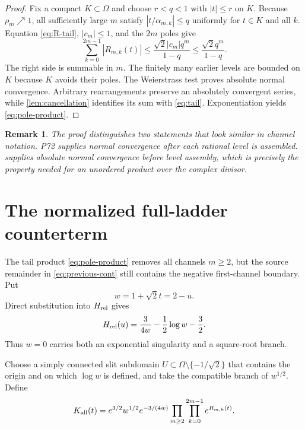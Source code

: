 \documentclass[11pt]{article}
\newtheorem{remark}[theorem]{Remark}
\newcommand{\Kall}{K_{\rm all}}
\begin{document}
\begin{proof}
Fix a compact $K\subset\Omega$ and choose $r<q<1$ with $|t|\le r$ on $K$.
Because $\rho_m\nearrow1$, all sufficiently large $m$ satisfy
$|t/\alpha_{m,k}|\le q$ uniformly for $t\in K$ and all $k$.  Equation
\eqref{eq:R-tail}, $|c_m|\le1$, and the $2m$ poles give
\begin{equation}\label{eq:majorant}
 \sum_{k=0}^{2m-1}|R_{m,k}(t)|
 \le \frac{\sqrt2|c_m|q^m}{1-q}
 \le \frac{\sqrt2q^m}{1-q}.
\end{equation}
The right side is summable in $m$.  The finitely many earlier levels are
bounded on $K$ because $K$ avoids their poles.  The Weierstrass test proves
absolute normal convergence.  Arbitrary rearrangements preserve an
absolutely convergent series, while \cref{lem:cancellation} identifies its
sum with \eqref{eq:tail}.  Exponentiation yields \eqref{eq:pole-product}.
\end{proof}

\begin{remark}
The proof distinguishes two statements that look similar in channel
notation.  P72 supplies normal convergence after each rational level is
assembled.   supplies absolute normal convergence before
level assembly, which is precisely the property needed for an unordered
product over the complex divisor.
\end{remark}

\section{The normalized full-ladder counterterm}

The tail product \eqref{eq:pole-product} removes all channels $m\ge2$, but
the source remainder in \eqref{eq:previous-cont} still contains the negative
first-channel boundary.  Put
\begin{equation}\label{eq:w}
 w=1+\sqrt2t=2-u.
\end{equation}
Direct substitution into $H_{\rm rel}$ gives
\begin{equation}\label{eq:H-w}
 H_{\rm rel}(u)=\frac{3}{4w}-\frac12\log w-\frac32.
\end{equation}
Thus $w=0$ carries both an exponential singularity and a square-root branch.

Choose a simply connected slit subdomain
$U\subset\Omega\setminus\{-1/\sqrt2\}$ that contains the origin and on which
$\log w$ is defined, and take the compatible branch of $w^{1/2}$.  Define
\begin{equation}\label{eq:Kall}
 \Kall(t)=e^{3/2}w^{1/2}e^{-3/(4w)}
 \prod_{m\ge2}\prod_{k=0}^{2m-1}e^{R_{m,k}(t)}.
\end{equation}
\end{document}
